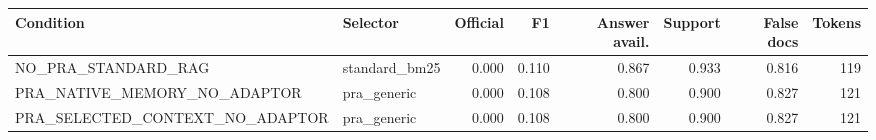 \begin{tabular}{llrrrrrr}
\toprule
Condition & Selector & Official & F1 & Answer avail. & Support & False docs & Tokens \\
\midrule
NO\_PRA\_STANDARD\_RAG & standard\_bm25 & 0.000 & 0.110 & 0.867 & 0.933 & 0.816 & 119 \\
PRA\_NATIVE\_MEMORY\_NO\_ADAPTOR & pra\_generic & 0.000 & 0.108 & 0.800 & 0.900 & 0.827 & 121 \\
PRA\_SELECTED\_CONTEXT\_NO\_ADAPTOR & pra\_generic & 0.000 & 0.108 & 0.800 & 0.900 & 0.827 & 121 \\
\bottomrule
\end{tabular}
